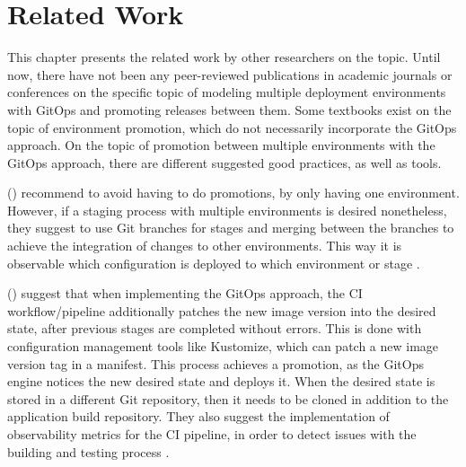 
\chapter{Related Work}
\label{related-work}


This chapter presents the related work by other researchers on the topic.
Until now, there have not been any peer-reviewed publications
in academic journals or conferences
on the specific topic of
modeling multiple deployment environments with GitOps and promoting releases between them.
Some textbooks exist on the topic of environment promotion, which
do not necessarily incorporate the GitOps approach.
On the topic of promotion between multiple environments
with the GitOps approach,
there are different suggested good practices,
as well as tools.





\citeauthor{gitopsCloudnativeCDInnoq} (\citeyear{gitopsCloudnativeCDInnoq})
recommend to avoid having to do promotions,
by only having one environment.
However, if a staging process with multiple environments is desired
nonetheless, they suggest to use Git branches for stages and merging
between the branches to achieve the integration of changes to other environments.
This way it is observable which configuration is deployed to which environment or stage \autocite{gitopsCloudnativeCDInnoq}.



\citeauthor{gitopsAndKubernetes2021continuous} (\citeyear{gitopsAndKubernetes2021continuous})
suggest that when implementing the GitOps approach,
the CI workflow/pipeline additionally patches the new image version into
the desired state,
after previous stages are completed without errors.
This is done with configuration management tools like Kustomize,
which can patch a new image version tag in a manifest.
This process achieves a promotion, as the GitOps engine notices the new desired state
and deploys it.
When the desired state is stored in a different Git repository,
then it needs to be cloned in addition to the application build repository.
They
also suggest the implementation of observability metrics for the CI pipeline,
in order to detect issues with the building and testing process
\autocite{gitopsAndKubernetes2021continuous}.

